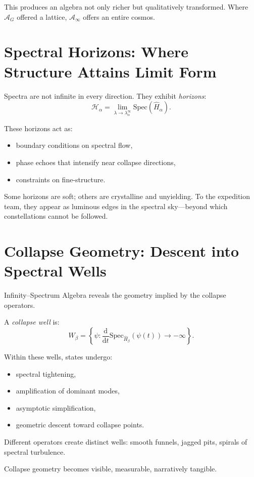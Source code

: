 This produces an algebra not only richer but qualitatively transformed.
Where $\mathcal{A}_G$ offered a lattice, $\mathcal{A}_\infty$ offers an entire cosmos.

\section{Spectral Horizons: Where Structure Attains Limit Form}
Spectra are not infinite in every direction. They exhibit \emph{horizons}:
\[
\mathcal{H}_\alpha = \lim_{\lambda \to \lambda_\alpha^{\infty}}
\mathrm{Spec}(\hat{H}_\alpha).
\]

These horizons act as:
\begin{itemize}
  \item boundary conditions on spectral flow,
  \item phase echoes that intensify near collapse directions,
  \item constraints on fine-structure.
\end{itemize}

Some horizons are soft; others are crystalline and unyielding.
To the expedition team, they appear as luminous edges in the spectral sky---beyond which
constellations cannot be followed.

\section{Collapse Geometry: Descent into Spectral Wells}
Infinity--Spectrum Algebra reveals the geometry implied by the collapse operators.

A \emph{collapse well} is:
\[
W_\beta
=
\left\{
\psi :
\frac{\mathrm{d}}{\mathrm{d}t}
\mathrm{Spec}_{\hat{H}_\beta}(\psi(t))
\rightarrow -\infty
\right\}.
\]

Within these wells, states undergo:
\begin{itemize}
  \item spectral tightening,
  \item amplification of dominant modes,
  \item asymptotic simplification,
  \item geometric descent toward collapse points.
\end{itemize}

Different operators create distinct wells:
smooth funnels, jagged pits, spirals of spectral turbulence.

Collapse geometry becomes visible, measurable, narratively tangible.

